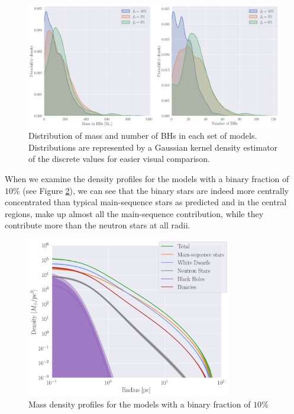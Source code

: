 \begin{figure}
	\centering
	\includegraphics[width=\textwidth]{figures/BH_KDEs.png}
	\caption{Distribution of mass and number of BHs in each set of models. Distributions are
		represented by a Gaussian kernel density estimator of the discrete values for easier visual
		comparison.}
	\label{fig:BH_KDEs}
\end{figure}

When we examine the density profiles for the models with a binary fraction of $10\%$ (see Figure
\ref{fig:highbin_model_densities}), we can see that the binary stars are indeed more centrally
concentrated than typical main-sequence stars as predicted and in the central regions, make up
almost all the main-sequence contribution, while they contribute more than the neutron stars at all
radii.



\begin{figure}
	\centering
	\includegraphics[width=0.8\textwidth]{figures/high_bin_model/density.png}
	\caption{Mass density profiles for the models with a binary fraction of $10\%$}
	\label{fig:highbin_model_densities}
\end{figure}

